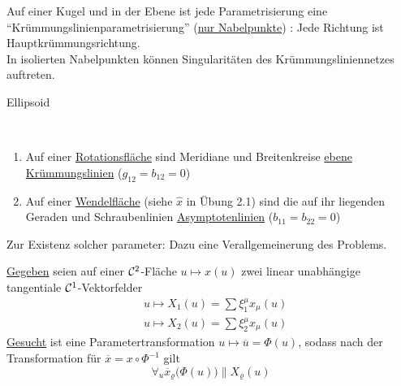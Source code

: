 \begin{bemerkung}
 Auf einer Kugel und in der Ebene ist jede Parametrisierung eine "`Krümmungslinienparametrisierung"' (\uline{nur Nabelpunkte}) : Jede Richtung ist Hauptkrümmungsrichtung. \\
 In isolierten Nabelpunkten können Singularitäten des Krümmungsliniennetzes auftreten.
 \begin{bsp}
  Ellipsoid
 \end{bsp}
\end{bemerkung}

\begin{bsp} \(\)
 \begin{enumerate}
  \item Auf einer \uline{Rotationsfläche} sind Meridiane und Breitenkreise \uline{ebene Krümmungslinien} (\(g_{12} = b_{12} = 0\))
  \item Auf einer \uline{Wendelfläche} (siehe \(\widehat x\) in Übung 2.1) sind die auf ihr liegenden Geraden und Schraubenlinien \uline{Asymptotenlinien} (\(b_{11} = b_{22} = 0\))
 \end{enumerate}

\end{bsp}

Zur Existenz solcher parameter: Dazu eine Verallgemeinerung des Problems. \par
\uline{Gegeben} seien auf einer \(\mathcal{C}^2\)-Fläche \(u \mapsto x(u)\) zwei linear unabhängige tangentiale \(\mathcal{C}^1\)-Vektorfelder
\begin{align*}
 &u \mapsto X_1(u) = \sum \xi^\mu_1 x_\mu (u) \\
 &u \mapsto X_2(u) = \sum \xi^\mu_2 x_\mu (u)
\end{align*}
\uline{Gesucht} ist eine Parametertransformation \(u \mapsto \overline u = \Phi(u)\), sodass nach der Transformation für \(\overline x = x \circ \Phi^{-1}\) gilt
\[
 \forall_u \overline x_\varrho \big(\Phi(u)\big) \parallel X_\varrho (u)
\]

